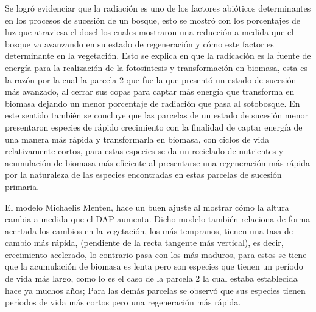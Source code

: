 \documentclass[letterpaper,9pt,onecolumn,twoside,]{pinp}
\begin{document}
Se logró evidenciar que la radiación es uno de los factores abióticos determinantes en los procesos de sucesión de un bosque, esto se mostró con los porcentajes de luz que atraviesa el dosel los cuales mostraron una reducción a medida que el bosque va 
avanzando en su estado de regeneración y cómo este factor es determinante en la vegetación. Esto se explica en que la radicación es la fuente de energía para la realización de la fotosíntesis y transformación en biomasa, esta es la razón por la cual la parcela 2 que fue la que presentó un estado de sucesión más avanzado, al cerrar sus copas para captar más energía que transforma en biomasa dejando un menor porcentaje de radiación que pasa al sotobosque. En este sentido también se concluye que las parcelas de un estado de sucesión menor presentaron especies de rápido crecimiento con la finalidad de captar energía de una manera más rápida y transformarla en biomasa, con ciclos de vida relativamente cortos, para estas especies se da un reciclado de nutrientes y acumulación de biomasa más eficiente al presentarse una regeneración más rápida por la naturaleza de las especies encontradas en estas parcelas de sucesión primaria. 

El modelo Michaelis Menten, hace un buen ajuste al mostrar cómo la altura cambia a medida que el DAP aumenta. Dicho modelo también relaciona de forma acertada los cambios en la vegetación, los más tempranos, tienen una tasa de cambio más rápida, (pendiente de la recta tangente más vertical), es decir, crecimiento acelerado, lo contrario pasa con los más maduros, para estos se tiene que la acumulación de biomasa es lenta pero son especies que tienen un período de vida más largo, como lo es el caso de la parcela 2 la cual estaba establecida hace ya muchos años; Para las demás parcelas se observó que sus especies tienen períodos de vida más cortos pero una regeneración más rápida. 







\end{document}
